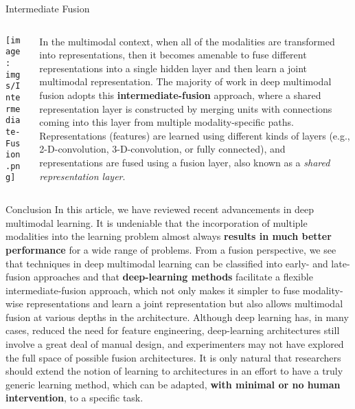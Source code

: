 \documentclass[aspectratio=169]{beamer}
\begin{document}
\begin{frame}{Intermediate  Fusion}
    \begin{columns}
        \begin{column}{.3\textwidth}
            \texttt{[image: imgs/Intermediate-Fusion.png]}
        \end{column}
        \begin{column}{.6\textwidth}
            In the multimodal context, when all of the modalities are
            transformed into representations, then it becomes amenable to fuse
            different
            representations into a single hidden layer and then learn a joint
            multimodal
            representation. The majority of work in deep multimodal fusion
            adopts this
            \large\textbf{intermediate-fusion} approach, where a shared
            representation
            layer is constructed by merging units with connections coming into
            this layer
            from multiple modality-specific paths. Representations (features)
            are learned
            using different kinds of layers (e.g., 2-D-convolution,
            3-D-convolution, or
            fully connected), and representations are fused using a fusion
            layer, also
            known as a \emph{shared representation layer}.
        \end{column}
    \end{columns}
\end{frame}

\begin{frame}{Conclusion}
    In this article, we have reviewed recent advancements in deep multimodal
    learning. It is undeniable that the incorporation of multiple modalities
    into
    the learning problem almost always \textbf{results in much better
        performance}
    for a wide range of problems. From a fusion perspective, we see that
    techniques
    in deep multimodal learning can be classified into early- and late-fusion
    approaches and that \textbf{deep-learning methods} facilitate a flexible
    intermediate-fusion approach, which not only makes it simpler to fuse
    modality-wise representations and learn a joint representation but also
    allows
    multimodal fusion at various depths in the architecture. Although deep
    learning
    has, in many cases, reduced the need for feature engineering, deep-learning
    architectures still involve a great deal of manual design, and
    experimenters
    may not have explored the full space of possible fusion architectures. It
    is
    only natural that researchers should extend the notion of learning to
    architectures in an effort to have a truly generic learning method, which
    can
    be adapted, \textbf{with minimal or no human intervention}, to a specific
    task.
\end{frame}
\end{document}
